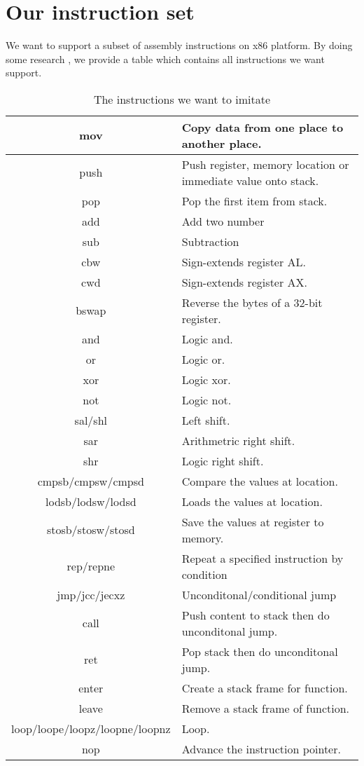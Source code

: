 \documentclass[12pt]{extarticle}
\begin{document}
\section{Our instruction set}
We want to support a subset of assembly instructions on x86 platform. 
By doing some research \cite{kusswurm2014modern}, we provide a table which contains all instructions we want support.
\begin{table}[h!]
    \centering
    \begin{tabular}{||c | p{9cm}||} 
     \hline
     mov & Copy data from one place to another place. \\ [0.5ex] 
     \hline
     push & Push register, memory location or immediate value onto stack.  \\ 
     \hline
     pop & Pop the first item from stack. \\
     \hline
     add & Add two number \\
     \hline
     sub &  Subtraction \\
     \hline
     cbw & Sign-extends register AL. \\
     \hline
     cwd & Sign-extends register AX. \\
     \hline
     bswap & Reverse the bytes of a 32-bit register. \\
     \hline
     and & Logic and. \\
     \hline
     or & Logic or. \\
     \hline
     xor & Logic xor. \\
     \hline
     not & Logic not. \\
     \hline
     sal/shl & Left shift. \\
     \hline
     sar & Arithmetric right shift. \\
     \hline
     shr & Logic right shift. \\
     \hline
     cmpsb/cmpsw/cmpsd & Compare the values at location. \\
     \hline
     lodsb/lodsw/lodsd & Loads the values at location. \\
     \hline
     stosb/stosw/stosd & Save the values at register to memory. \\
     \hline
     rep/repne & Repeat a specified instruction by condition \\
     \hline
     jmp/jcc/jecxz & Unconditonal/conditional jump \\
     \hline
     call & Push content to stack then do unconditonal jump.\\
     \hline
     ret & Pop stack then do unconditonal jump.\\
     \hline
     enter & Create a stack frame for function.\\
     \hline
     leave & Remove a stack frame of function.\\
     \hline
     loop/loope/loopz/loopne/loopnz & Loop.\\
     \hline
     nop & Advance the instruction pointer.\\
     \hline
    \end{tabular}
    \caption{The instructions we want to imitate}
    \label{table:2}
\end{table}

{}

\end{document}
